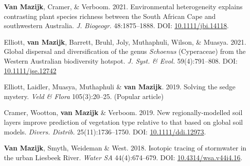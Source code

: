 \begin{hangparas}{2em}{1}

\textbf{Van Mazijk}, Cramer, \& Verboom. 2021.
Environmental heterogeneity explains contrasting plant species richness between
the South African Cape and southwestern Australia. \textit{J. Biogeogr.}
48:1875--1888. DOI: \href{https://doi.org/10.1111/jbi.14118}{10.1111/jbi.14118}.

Elliott, \textbf{van Mazijk}, Barrett, Bruhl, Joly,
Muthaphuli, Wilson, \& Muasya. 2021. Global dispersal and
diversification of the genus \textit{Schoenus} (Cyperaceae) from the Western
Australian biodiversity hotspot. \textit{J. Syst. \& Evol.} 59(4):791--808. DOI:
\href{https://doi.org/10.1111/jse.1274}{10.1111/jse.12742}

Elliott, Laidler, Muasya, Muthaphuli \& \textbf{van Mazijk}. 2019. Solving the
sedge mystery. \textit{Veld \& Flora} 105(3):20--25. (Popular article)

Cramer, Wootton, \textbf{van Mazijk} \& Verboom. 2019.
New regionally-modelled soil layers improve prediction of vegetation type
relative to that based on global soil models. \textit{Divers. Distrib.}
25(11):1736--1750. DOI:
\href{https://doi.org/10.1111/ddi.12973}{10.1111/ddi.12973}.

\textbf{Van Mazijk}, Smyth, Weideman \& West. 2018.
Isotopic tracing of stormwater in the urban Liesbeek River. \textit{Water SA}
44(4):674--679. DOI:
\href{https://doi.org/10.4314/wsa.v44i4.16}{10.4314/wsa.v44i4.16}.

\end{hangparas}

